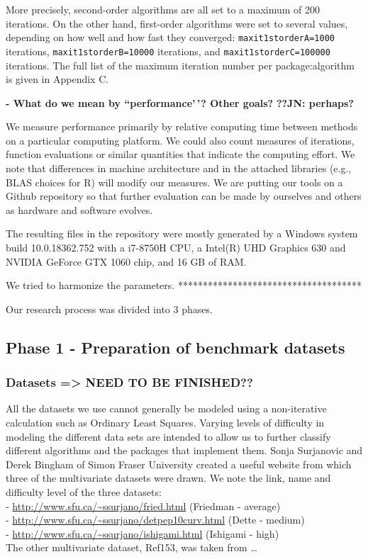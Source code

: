 More precisely, second-order algorithms are all set to a maximum of 200
iterations. On the other hand, first-order algorithms were set to
several values, depending on how well and how fast they converged:
\texttt{maxit1storderA=1000} iterations, \texttt{maxit1storderB=10000}
iterations, and \texttt{maxit1storderC=100000} iterations. The full list
of the maximum iteration number per package:algorithm is given in
Appendix C.

\textbf{- What do we mean by ``performance'\,'? Other goals?}
\textbf{??JN: perhaps?}

We measure performance primarily by relative computing time between
methods on a particular computing platform. We could also count measures
of iterations, function evaluations or similar quantities that indicate
the computing effort. We note that differences in machine architecture
and in the attached libraries (e.g., BLAS choices for R) will modify our
measures. We are putting our tools on a Github repository so that
further evaluation can be made by ourselves and others as hardware and
software evolves.

The resulting files in the repository were mostly generated by a Windows
system build 10.0.18362.752 with a i7-8750H CPU, a Intel(R) UHD Graphics
630 and NVIDIA GeForce GTX 1060 chip, and 16 GB of RAM.

We tried to harmonize the parameters.
*************************************

Our research process was divided into 3 phases.

\hypertarget{phase-1---preparation-of-benchmark-datasets}{%
\subsection{Phase 1 - Preparation of benchmark
datasets}\label{phase-1---preparation-of-benchmark-datasets}}

\hypertarget{datasets-need-to-be-finished}{%
\subsubsection{Datasets =\textgreater{} NEED TO BE
FINISHED??}\label{datasets-need-to-be-finished}}

All the datasets we use cannot generally be modeled using a
non-iterative calculation such as Ordinary Least Squares. Varying levels
of difficulty in modeling the different data sets are intended to allow
us to further classify different algorithms and the packages that
implement them. Sonja Surjanovic and Derek Bingham of Simon Fraser
University created a useful website from which three of the multivariate
datasets were drawn. We note the link, name and difficulty level of the
three datasets:\\
- \url{http://www.sfu.ca/~ssurjano/fried.html} (Friedman - average)\\
- \url{http://www.sfu.ca/~ssurjano/detpep10curv.html} (Dette - medium)\\
- \url{http://www.sfu.ca/~ssurjano/ishigami.html} (Ishigami - high)\\
The other multivariate dataset, Ref153, was taken from \ldots{}

